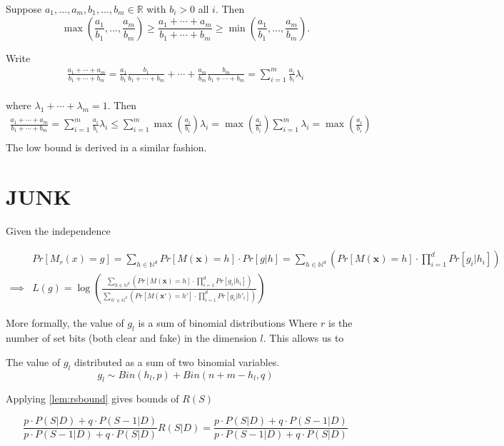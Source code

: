 \documentclass[11pt]{article}
\newcommand{\bbx}{\pmb{x}}
\newcommand{\R}{\mathbb{R}}
\newcommand{\N}{\mathbb{N}}
\begin{document}
\begin{lem} \label{lem:rsbound}
Suppose $a_1,\dots,a_m,b_1,\dots,b_m \in \R$ with $b_i > 0$ all $i$.
Then 
\[ \max\left(\frac{a_1}{b_1},\dots,\frac{a_m}{b_m}\right) \geq  \frac{a_1 + \cdots + a_m}{b_1 + \cdots + b_m} \geq \min \left(\frac{a_1}{b_1},\dots,\frac{a_m}{b_m}\right). \]
\end{lem}
\begin{pf}
Write
 \begin{align*}
  \frac{a_1 + \cdots + a_m}{b_1 + \cdots + b_m}
= \frac{a_1}{b_1}\frac{b_1}{b_1+\cdots+b_m} +
\cdots + \frac{a_m}{b_m}\frac{b_m}{b_1+\cdots+b_m} = \sum_{i=1}^m \frac{a_i}{b_i} \lambda_i  \\ 
\end{align*}

where $\lambda_1 + \cdots + \lambda_m = 1$.  Then
 \begin{align*}
  \frac{a_1 + \cdots + a_m}{b_1 + \cdots + b_m} = \sum_{i=1}^m \frac{a_i}{b_i} \lambda_i  \leq  \sum_{i=1}^m \max \left ( \frac{a_i}{b_i} \right ) \lambda_i  = \max \left ( \frac{a_i}{b_i} \right ) \sum_{i=1}^m \lambda_i = \max \left ( \frac{a_i}{b_i} \right ) \\ 
\end{align*}
The low bound is derived in a similar fashion. 
\end{pf}



\section{JUNK}


Given the independence 



 \begin{align*}
 & Pr [ M_r(x) = g ] = \sum_{h \in \N^d} Pr \left [  M(\bbx) = h \right ] \cdot Pr [ g | h ] =  \sum_{h \in \N^d} \left ( Pr \left [  M(\bbx) = h \right ] \cdot  \prod_{i=1}^d Pr[ g_i | h_i]  \right ) \\
\implies &  L(g) =  \log  \left ( \frac{  \sum_{h \in \N^d} \left ( Pr \left [  M(\bbx) = h \right ] \cdot  \prod_{i=1}^d Pr[ g_i | h_i]  \right )  }{    \sum_{h' \in \N^d} \left ( Pr \left [  M(\bbx') = h' \right ] \cdot  \prod_{i=1}^d Pr[ g_i | h'_i]  \right )  } \right )
\end{align*}



More formally, the value of $g_l$ is a sum of binomial distributions 
Where $r$ is the number of set bits (both clear and fake) in the dimension $l$.   This allows us to 



The value of $g_l$ distributed as a sum of two binomial variables.  
\[ g_l  \sim Bin(h_l,p) + Bin(n+m-h_l,q) \]
 
 
Applying \eqref{lem:rsbound} gives bounds of $R(S)$

\begin{equation} \label{eq:rsbounds}
 \frac{p \cdot P(S | D ) + q \cdot P( S - 1 | D) } {  p  \cdot P(S -1 | D ) + q \cdot P( S  | D)  } R(S|D)=  \frac{p \cdot P(S | D ) + q \cdot P( S - 1 | D) } {  p  \cdot P(S -1 | D ) + q \cdot P( S  | D)  }
\end{equation}
\end{document}

